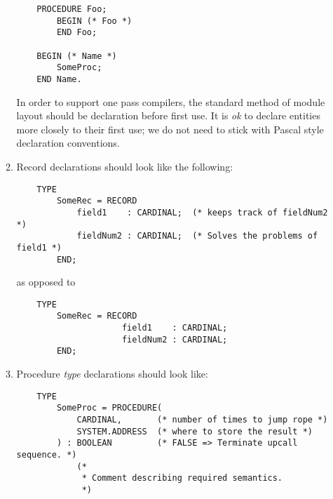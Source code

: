 \begin{enumerate}
\begin{enumerate}
\begin{verbatim}
    PROCEDURE Foo;
        BEGIN (* Foo *)
        END Foo;

    BEGIN (* Name *)
        SomeProc;
    END Name.
        \end{verbatim}
        In order to support one pass compilers, the standard method of
	module layout should be declaration before first 
	use.  
        It is {\em ok}
        to declare entities more closely to their first use; we do
        not need to stick with Pascal style declaration conventions.

    \item
    Record declarations should look like the following:
        \begin{verbatim}
    TYPE
        SomeRec = RECORD
            field1    : CARDINAL;  (* keeps track of fieldNum2 *)
            fieldNum2 : CARDINAL;  (* Solves the problems of field1 *)
        END;
        \end{verbatim}
        as opposed to 
        \begin{verbatim}
    TYPE
        SomeRec = RECORD
                     field1    : CARDINAL;
                     fieldNum2 : CARDINAL;
        END;
        \end{verbatim}
    \item
    Procedure {\em type} declarations should look like:
        \begin{verbatim}
    TYPE
        SomeProc = PROCEDURE(
            CARDINAL,       (* number of times to jump rope *)
            SYSTEM.ADDRESS  (* where to store the result *)
        ) : BOOLEAN         (* FALSE => Terminate upcall sequence. *)
            (*
             * Comment describing required semantics.
             *)
        \end{verbatim}


\end{enumerate}
\end{enumerate}
